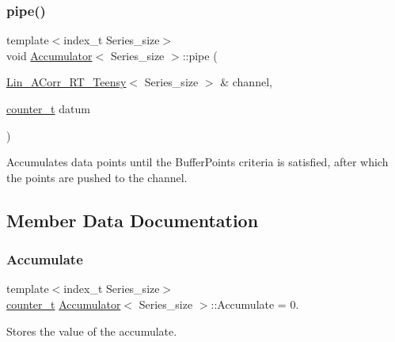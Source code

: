 \subsubsection{\texorpdfstring{pipe()}{pipe()}}
{\footnotesize\ttfamily template$<$index\+\_\+t Series\+\_\+size$>$ \\
void \hyperlink{classAccumulator}{Accumulator}$<$ Series\+\_\+size $>$\+::pipe (\begin{DoxyParamCaption}\item[{\hyperlink{classLin__ACorr__RT__Teensy}{Lin\+\_\+\+A\+Corr\+\_\+\+R\+T\+\_\+\+Teensy}$<$ Series\+\_\+size $>$ \&}]{channel,  }\item[{\hyperlink{types_8hpp_a22f279793847eba127de149437848c48}{counter\+\_\+t}}]{datum }\end{DoxyParamCaption})\hspace{0.3cm}{\ttfamily [inline]}}



Accumulates data points until the Buffer\+Points criteria is satisfied, after which the points are pushed to the channel. 



\subsection{Member Data Documentation}
\mbox{\label{classAccumulator_a5b21e86275e8a4fb3223ddbd3d9d09fc}} 
\subsubsection{\texorpdfstring{Accumulate}{Accumulate}}
{\footnotesize\ttfamily template$<$index\+\_\+t Series\+\_\+size$>$ \\
\hyperlink{types_8hpp_a22f279793847eba127de149437848c48}{counter\+\_\+t} \hyperlink{classAccumulator}{Accumulator}$<$ Series\+\_\+size $>$\+::Accumulate = 0.\hspace{0.3cm}{\ttfamily [private]}}



Stores the value of the accumulate. 

\mbox{\label{classAccumulator_a1c24cae338768ee66f18f0abc2adea8c}} 
